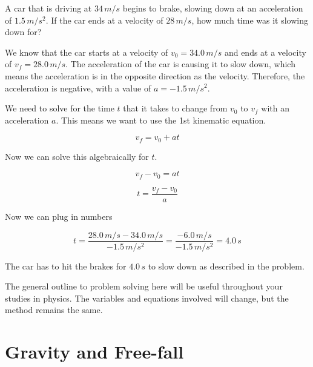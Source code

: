 \documentclass[12pt]{book}
\begin{document}
\begin{exampleblock}

A car that is driving at $34 \, m/s$ begins to brake, slowing down at an acceleration of $1.5 \, m/s^2$. If the car ends at a velocity of $28 \, m/s$, how much time was it slowing down for?

\hspace{10pt}

We know that the car starts at a velocity of $v_0 = 34.0 \, m/s$ and ends at a velocity of $v_f = 28.0 \, m/s$. The acceleration of the car is causing it to slow down, which means the acceleration is in the opposite direction as the velocity. Therefore, the acceleration is negative, with a value of $a = -1.5 \, m/s^2$.

We need to solve for the time $t$ that it takes to change from $v_0$ to $v_f$ with an acceleration $a$. This means we want to use the 1st kinematic equation.

\begin{equation}
v_f = v_0 + at
\end{equation}

Now we can solve this algebraically for $t$.

\begin{equation}
v_f - v_0 = at
\end{equation}

\begin{equation}
t = \frac{v_f - v_0}{a}
\end{equation}

Now we can plug in numbers

\begin{equation}
t = \frac{28.0 \, m/s - 34.0 \, m/s}{-1.5 \, m/s^2} = \frac{-6.0 \, m/s}{-1.5 \, m/s^2} = 4.0 \, s
\end{equation}

The car has to hit the brakes for $4.0 \, s$ to slow down as described in the problem. 

\end{exampleblock}

The general outline to problem solving here will be useful throughout your studies in physics. The variables and equations involved will change, but the method remains the same.

\section{Gravity and Free-fall}
\label{gravsec}
\end{document}
